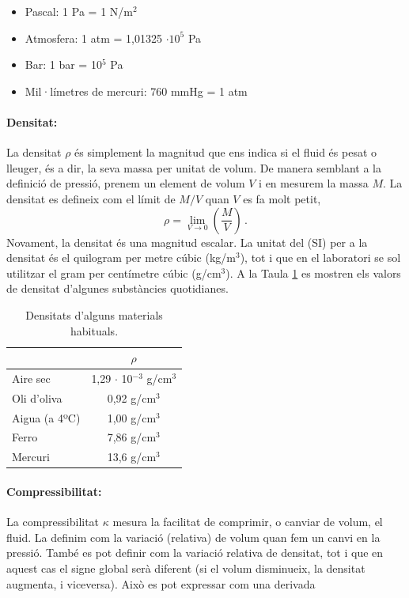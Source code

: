 \documentclass[12pt]{book}
\begin{document}
\begin{itemize}
    \item Pascal:    1 Pa = 1 N/m$^2$
    \item Atmosfera: 1 atm = 1,01325 $\cdot 10^5$ Pa
    \item Bar:       1 bar = 10$^5$ Pa
    \item Mil·límetres de mercuri: 760 mmHg = 1 atm
\end{itemize}

\paragraph{Densitat:} La densitat $\rho$ és simplement la magnitud que ens indica si el fluid és pesat o lleuger, és a dir, la seva massa per unitat de volum. De manera semblant a la definició de pressió, prenem un element de volum $V$ i en mesurem la massa $M$. La densitat es defineix com el límit de $M/V$ quan $V$ es fa molt petit,
%
\begin{equation}
    \rho = \lim_{V \to 0} \left(\frac{M}{V}\right)\, .
\end{equation}
%
Novament, la densitat és una magnitud escalar. La unitat del (SI) per a la densitat és el quilogram per metre cúbic (kg/m$^3$), tot i que en el laboratori se sol utilitzar el gram per centímetre cúbic (g/cm$^3$). A la Taula \ref{tab:Densitats} es mostren els valors de densitat d'algunes substàncies quotidianes.

\begin{table}[H]
    \centering
    \begin{tabular}{|l|c|}
    \hline
                      & $\rho$ \\ \hline
        Aire sec      & 1,29 $\cdot$ 10$^{-3}$ g/cm$^3$ \\ \hline
        Oli d'oliva   & 0,92 g/cm$^3$ \\ \hline
        Aigua (a 4ºC) & 1,00 g/cm$^3$ \\ \hline
        Ferro         & 7,86 g/cm$^3$ \\ \hline
        Mercuri       & 13,6 g/cm$^3$ \\ \hline
    \end{tabular}
    \caption{Densitats d'alguns materials habituals.}
    \label{tab:Densitats}
\end{table}

\paragraph{Compressibilitat:} La compressibilitat $\kappa$ mesura la facilitat de comprimir, o canviar de volum, el fluid. La definim com la variació (relativa) de volum quan fem un canvi en la pressió. També es pot definir com la variació relativa de densitat, tot i que en aquest cas el signe global serà diferent (si el volum disminueix, la densitat augmenta, i viceversa). Això es pot expressar com una derivada
\end{document}
